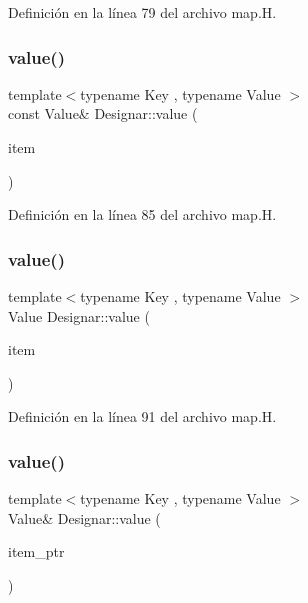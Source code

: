 Definición en la línea 79 del archivo map.\+H.

\mbox{\label{namespace_designar_a0b1fbaad8d9cadc07bd73cd65baf6b3f}} 
\subsubsection{\texorpdfstring{value()}{value()}\hspace{0.1cm}{\footnotesize\ttfamily [2/4]}}
{\footnotesize\ttfamily template$<$typename Key , typename Value $>$ \\
const Value\& Designar\+::value (\begin{DoxyParamCaption}\item[{const \hyperlink{namespace_designar_a7394b1b25278abf7211e77b91eb5204f}{Map\+Key}$<$ Key, Value $>$ \&}]{item }\end{DoxyParamCaption})}



Definición en la línea 85 del archivo map.\+H.

\mbox{\label{namespace_designar_a54c38cc2398cdee4d9641ed50f43110b}} 
\subsubsection{\texorpdfstring{value()}{value()}\hspace{0.1cm}{\footnotesize\ttfamily [3/4]}}
{\footnotesize\ttfamily template$<$typename Key , typename Value $>$ \\
Value Designar\+::value (\begin{DoxyParamCaption}\item[{\hyperlink{namespace_designar_a7394b1b25278abf7211e77b91eb5204f}{Map\+Key}$<$ Key, Value $>$ \&\&}]{item }\end{DoxyParamCaption})}



Definición en la línea 91 del archivo map.\+H.

\mbox{\label{namespace_designar_a93bd8a834a0093067e2da608fc18e4e4}} 
\subsubsection{\texorpdfstring{value()}{value()}\hspace{0.1cm}{\footnotesize\ttfamily [4/4]}}
{\footnotesize\ttfamily template$<$typename Key , typename Value $>$ \\
Value\& Designar\+::value (\begin{DoxyParamCaption}\item[{\hyperlink{namespace_designar_a7394b1b25278abf7211e77b91eb5204f}{Map\+Key}$<$ Key, Value $>$ $\ast$}]{item\+\_\+ptr }\end{DoxyParamCaption})}



